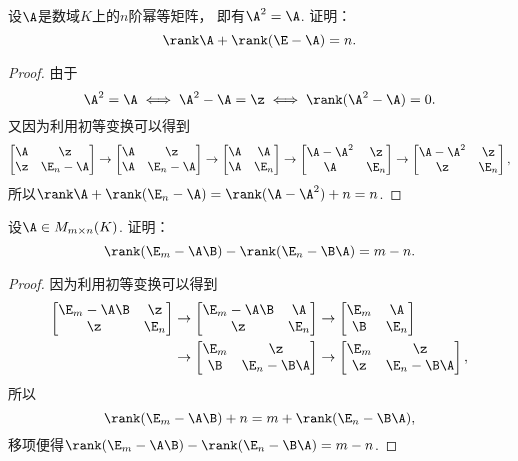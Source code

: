\begin{example}\label{example:幂等矩阵.幂等矩阵的秩的性质1}
设\(\A\)是数域\(K\)上的\(n\)阶幂等矩阵，
即有\(\A^2=\A\).
证明：\[
	\rank\A+\rank(\E-\A)=n.
\]
\begin{proof}
由于\[
	\A^2=\A
	\iff
	\A^2-\A=\z
	\iff
	\rank(\A^2-\A)=0.
\]
又因为利用初等变换可以得到\[
	\begin{bmatrix}
		\A & \z \\
		\z & \E_n-\A
	\end{bmatrix}
	\to \begin{bmatrix}
		\A & \z \\
		\A & \E_n-\A
	\end{bmatrix}
	\to \begin{bmatrix}
		\A & \A \\
		\A & \E_n
	\end{bmatrix}
	\to \begin{bmatrix}
		\A-\A^2 & \z \\
		\A & \E_n
	\end{bmatrix}
	\to \begin{bmatrix}
		\A-\A^2 & \z \\
		\z & \E_n
	\end{bmatrix},
\]
所以\(\rank\A+\rank(\E_n-\A)
=\rank(\A-\A^2)+n
=n\).
\end{proof}
\end{example}

\begin{example}
设\(\A \in M_{m \times n}(K)\).
证明：\[
	\rank(\E_m-\A\B)-\rank(\E_n-\B\A)=m-n.
\]
\begin{proof}
因为利用初等变换可以得到\begin{align*}
	\begin{bmatrix}
		\E_m-\A\B & \z \\
		\z & \E_n
	\end{bmatrix}
	&\to \begin{bmatrix}
		\E_m-\A\B & \A \\
		\z & \E_n
	\end{bmatrix}
	\to \begin{bmatrix}
		\E_m & \A \\
		\B & \E_n
	\end{bmatrix} \\
	&\to \begin{bmatrix}
		\E_m & \z \\
		\B & \E_n-\B\A
	\end{bmatrix}
	\to \begin{bmatrix}
		\E_m & \z \\
		\z & \E_n-\B\A
	\end{bmatrix},
\end{align*}
所以\[
	\rank(\E_m-\A\B)+n=m+\rank(\E_n-\B\A),
\]
移项便得\(\rank(\E_m-\A\B)-\rank(\E_n-\B\A)=m-n\).
\end{proof}
\end{example}

